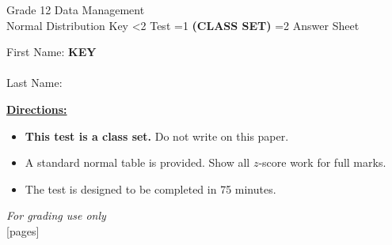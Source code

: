 \documentclass[addpoints]{exam}
\newcommand{\event}{Normal Distribution}
\newcommand{\tournament}{}
\def\type{0}
\begin{document}
\begin{center}
    {\huge Grade 12 Data Management \\ \event
    \ifprintanswers \space Key
    \else \space \ifnum\type<2 Test \fi \ifnum\type=1 \textbf{(CLASS SET)} \fi
          \ifnum\type=2 Answer Sheet \fi
    \fi \\ \vspace{3mm}\tournament\vspace{1mm}}
\end{center}

\vspace{.25\textheight}

\begin{center}
    First Name: \ifprintanswers
    \underline{\hspace{3.5cm}}\textbf{KEY}\underline{\hspace{5.5cm}}\\\vspace{5mm}
    \else \underline{\hspace{10cm}}\\ \vspace{5mm} \fi
    Last Name: \underline{\hspace{10cm}}\\ \vspace{5mm}
\end{center}

\noindent\textbf{\underline{Directions:}}
\begin{itemize}
    \ifnum\type=1 \item \textbf{This test is a class set.} Do not write on this paper. \fi
    \item A standard normal table is provided. Show all $z$-score work for full marks.
    \item The test is designed to be completed in 75 minutes.
\end{itemize}
\begin{center}
\textit{For grading use only}\\
[pages]
\end{center}
\end{document}
